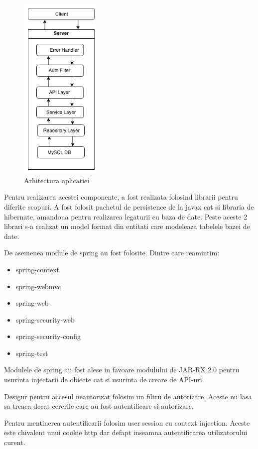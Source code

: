\documentclass[conference]{IEEEtran}
\begin{document}
\begin{figure}[ht!]
\centering
\includegraphics[height=90mm]{arhitecture.png}
\caption{Arhitectura aplicatiei}
\label{overflow}
\end{figure}

Pentru realizarea acestei componente, a fost realizata folosind librarii pentru diferite scopuri. A fost folosit pachetul de persistence de la javax cat si	libraria de hibernate, amandoua pentru realizarea legaturii cu baza de date. Peste aceste 2 librari s-a realizat un model format din entitati care modeleaza tabelele bazei de date.

De asemenea module de spring au fost folosite. Dintre care reamintim:
\begin{itemize}
        \item spring-context
        \item spring-webmvc
        \item spring-web
        \item spring-security-web
        \item spring-security-config
        \item spring-test
      \end{itemize}
Modulele de spring au fost alese in favoare modulului de JAR-RX 2.0 pentru usurinta injectarii de obiecte cat si usurinta de creare de API-uri. 

Desigur pentru accesul neautorizat folosim un filtru de autorizare. Aceste nu lasa sa treaca decat cererile care au fost autentificare si autorizare.

Pentru mentinerea autentificarii folosim user session cu context injection. Aceste este chivalent unui cookie http dar defapt inseamna autentificarea utilizatorului curent.
      
\end{document}
